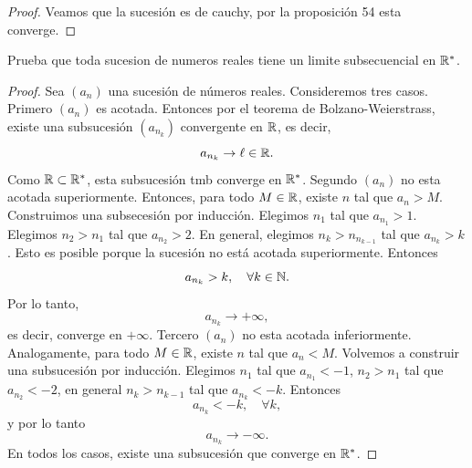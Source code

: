 \documentclass[12pt,a4paper]{article}
\begin{document}
    \begin{proof}
        Veamos que la sucesión es de cauchy, por la proposición 54 esta converge.
    \end{proof}

    \begin{mdframed}[style=mdpinkbox,frametitle={Ejercicio 4}]
        Prueba que toda sucesion de numeros reales tiene un limite subsecuencial en $\mathbb{R}^{*}$.
    \end{mdframed}

    \begin{proof}
        Sea $(a_{n})$ una sucesión de números reales. Consideremos tres casos. Primero $(a_{n})$ es acotada.
        Entonces por el teorema de Bolzano-Weierstrass, existe una subsucesión $(a_{n_{k}})$ convergente en $\mathbb{R}$,
        es decir,
        \begin{equation*}
            a_{n_{k}}\to\ell\in\mathbb{R}.
        \end{equation*}
        Como $\mathbb{R}\subset\mathbb{R}^{*}$, esta subsucesión tmb converge en $\mathbb{R}^{*}$. Segundo $(a_{n})$ no esta acotada superiormente.
        Entonces, para todo $M\in\mathbb{R}$, existe $n$ tal que $a_{n}\gt M$. Construimos una subsecesión por inducción. Elegimos
        $n_{1}$ tal que $a_{n_{1}}\gt1$. Elegimos $n_{2}\gt n_{1}$ tal que $a_{n_{2}}\gt2$. En general, elegimos $n_{k}\gt n_{n_{k-1}}$
        tal que $a_{n_{k}}\gt k$. Esto es posible porque la sucesión no está acotada superiormente. Entonces
        \begin{equation*}
            a_{n_{k}}> k,\quad \forall k\in\mathbb{N}.
        \end{equation*}
        Por lo tanto,
        \begin{equation*}
            a_{n_{k}}\to+\infty,
        \end{equation*}
        es decir, converge en $+\infty$. Tercero $(a_{n})$ no esta acotada inferiormente. Analogamente, para todo $M\in\mathbb{R}$,
        existe $n$ tal que $a_{n}\lt M$. Volvemos a construir una subsucesión por inducción. Elegimos $n_{1}$ tal que $a_{n_{1}}\lt-1$,
        $n_{2}\gt n_{1}$ tal que $a_{n_{2}}\lt-2$, en general $n_{k}\gt n_{k-1}$ tal que $a_{n_{k}}\lt -k$. Entonces
        \begin{equation*}
            a_{n_{k}}\lt-k,\quad\forall k,
        \end{equation*}
        y por lo tanto
        \begin{equation*}
            a_{n_{k}}\to-\infty.
        \end{equation*}
        En todos los casos, existe una subsucesión que converge en $\mathbb{R}^{*}$.
    \end{proof}
\end{document}
